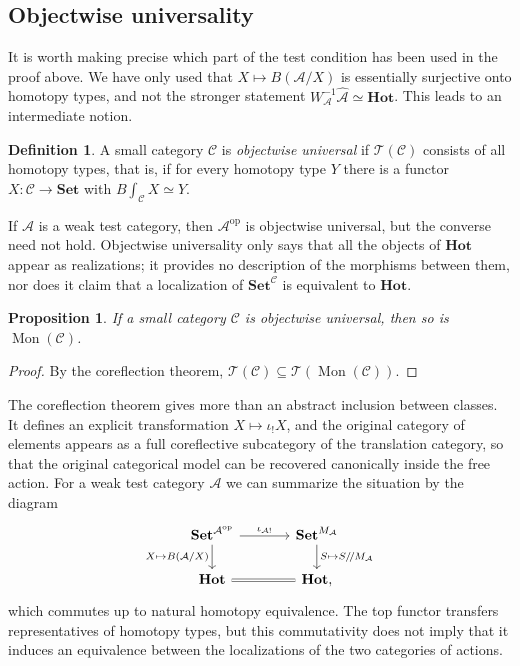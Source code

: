 \documentclass[11pt]{amsart}
\newtheorem{proposition}[teo]{Proposition}
\theoremstyle{definition}
\newtheorem{definition}[teo]{Definition}
\theoremstyle{remark}
\numberwithin{figure}{section}%
\newcommand{\CC}{\mathcal{C}}
\DeclareMathOperator{\Mon}{Mon}
\newcommand{\T}{\mathcal{T}}
\newcommand{\Set}{\mathbf{Set}}
\newcommand{\Hot}{\mathbf{Hot}}
\newcommand{\op}{\mathrm{op}}
\newcommand{\A}{\mathcal{A}}
\begin{document}
\subsection{Objectwise universality}
\label{subsec:objectwise-universality}

It is worth making precise which part of the test condition has been used in the proof above. We have only used that $X\mapsto B(\A/X)$ is essentially surjective onto homotopy types, and not the stronger statement $W_\A^{-1}\widehat{\A}\simeq\Hot$. This leads to an intermediate notion.

\begin{definition}
A small category $\CC$ is \emph{objectwise universal} if $\T(\CC)$ consists of all homotopy types, that is, if for every homotopy type $Y$ there is a functor $X\colon\CC\to\Set$ with $B\!\int_{\CC}X\simeq Y$.
\end{definition}

If $\A$ is a weak test category, then $\A^{\op}$ is objectwise universal, but the converse need not hold. Objectwise universality only says that all the objects of $\Hot$ appear as realizations; it provides no description of the morphisms between them, nor does it claim that a localization of $\Set^{\CC}$ is equivalent to $\Hot$.

\begin{proposition}
\label{prop:Mon-preserves-objectwise-universality}
If a small category $\CC$ is objectwise universal, then so is $\Mon(\CC)$.
\end{proposition}

\begin{proof}
By the coreflection theorem, $\T(\CC)\subseteq\T(\Mon(\CC))$.
\end{proof}

The coreflection theorem gives more than an abstract inclusion between classes. It defines an explicit transformation $X\mapsto\iota_!X$, and the original category of elements appears as a full coreflective subcategory of the translation category, so that the original categorical model can be recovered canonically inside the free action. For a weak test category $\A$ we can summarize the situation by the diagram
\[
\begin{tikzcd}[column sep=large]
\Set^{\A^{\op}} \ar[r,"\iota_{\A!}"] \ar[d,"X\mapsto B(\A/X)"'] & \Set^{M_\A} \ar[d,"S\mapsto S/\!/M_\A"]\\
\Hot \ar[r,equal] & \Hot,
\end{tikzcd}
\]
which commutes up to natural homotopy equivalence. The top functor transfers representatives of homotopy types, but this commutativity does not imply that it induces an equivalence between the localizations of the two categories of actions.
\end{document}
